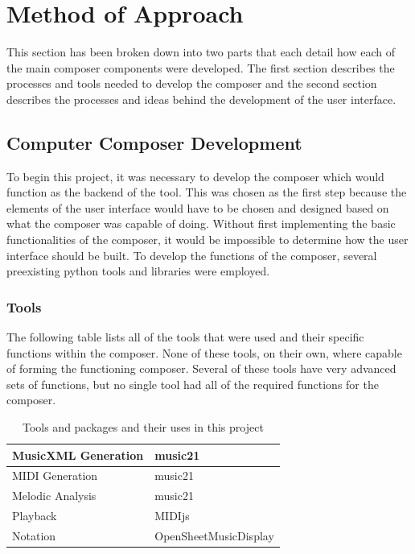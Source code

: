 \chapter{Method of Approach} 
\label{ch:methodofapproach}

This section has been broken down into two parts that each detail how each of the main composer components were developed.  The first section describes the processes and tools needed to develop the composer and the second section describes the processes and ideas behind the development of the user interface.

\section{Computer Composer Development}
\label{sec:computercomposerdevelopment}

To begin this project, it was necessary to develop the composer which would function as the backend of the tool.  This was chosen as the first step because the elements of the user interface would have to be chosen and designed based on what the composer was capable of doing.  Without first implementing the basic functionalities of the composer, it would be impossible to determine how the user interface should be built.  To develop the functions of the composer, several preexisting python tools and libraries were employed.

\vspace{\baselineskip}

\subsection{Tools}
\label{subsec:tools}

The following table lists all of the tools that were used and their specific functions within the composer.  None of these tools, on their own, where capable of forming the functioning composer.  Several of these tools have very advanced sets of functions, but no single tool had all of the required functions for the composer.

\begin{table}[!htbp]
	\centering
	\caption{Tools and packages and their uses in this project}
	\begin{tabular}{|l|l|}
		\hline
		MusicXML Generation & music21 \\ \hline
		MIDI Generation & music21 \\ \hline
		Melodic Analysis & music21 \\ \hline
		Playback & MIDIjs \\ \hline
		Notation & OpenSheetMusicDisplay \\ \hline
	\end{tabular}
\end{table}

